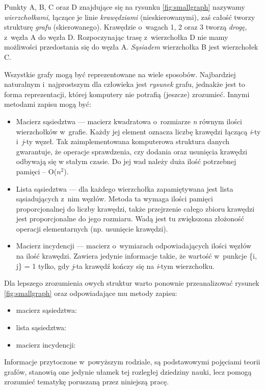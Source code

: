 \documentclass[a4paper,12pt,polish,oneside,openright]{thesis}
\begin{document}
Punkty A, B, C oraz D znajdujące się na rysunku \ref{fig:smallgraph} nazywamy \emph{wierzchołkami}, łączące je linie \emph{krawędziami} (nieskierowanymi), zaś całość tworzy strukturę \emph{grafu} (skierowanego).
Krawędzie o~wagach 1, 2 oraz 3 tworzą \emph{drogę}, z~węzła A do węzła D. Rozpoczynając trasę z~wierzchołka D nie mamy możliwości przedostania się do węzła A.
\emph{Sąsiadem} wierzchołka B jest wierzchołek C.

Wszystkie grafy mogą być reprezentowane na wiele sposobów.
Najbardziej naturalnym i~najprostszym dla człowieka jest \emph{rysunek} grafu, jednakże jest to forma reprezentacji, której komputery nie potrafią (jeszcze) zrozumieć.
Innymi metodami zapisu mogą być:
\begin{itemize}
	\item Macierz sąsiedztwa --- macierz kwadratowa o~rozmiarze \emph{n} równym ilości wierzchołków w~grafie.
	Każdy jej element oznacza liczbę krawędzi łączącą \emph{i}-ty i~\emph{j}-ty węzeł.
	Tak zaimplementowana komputerowa struktura danych gwarantuje, że operacje sprawdzenia, czy dodania oraz usunięcia krawędzi odbywają się w stałym czasie.
	Do jej wad należy duża ilość potrzebnej pamięci – O($n^2$).

	\label{neigh_list}
	\item Lista sąsiedztwa --- dla każdego wierzchołka zapamiętywana jest lista sąsiadujących z~nim węzłów.
	Metoda ta wymaga ilości pamięci proporcjonalnej do liczby krawędzi, także przejrzenie całego zbioru krawędzi jest proporcjonalne do jego rozmiaru.
	Wadą jest tu zwiększona złożoność operacji elementarnych (np. usunięcie krawędzi).

	\item Macierz incydencji --- macierz o~wymiarach odpowiadających ilości węzłów na ilość krawędzi.
	Zawiera jedynie informacje takie, że wartość w~punkcje \{i, j\} = 1 tylko, gdy \emph{j}-ta krawędź kończy się na \emph{i}-tym wierzchołku.
\end{itemize}

Dla lepszego zrozumienia owych struktur warto ponownie przeanalizować rysunek \ref{fig:smallgraph}
oraz odpowiadające mu metody zapisu:
\begin{itemize}
	\item macierz sąsiedztwa:
	\item lista sąsiedztwa:
	\item macierz incydencji:
\end{itemize}

Informacje przytoczone w~powyższym rodziale, są podstawowymi pojęciami teorii grafów, stanowią one jedynie ułamek tej rozległej dziedziny nauki, lecz pomogą zrozumieć tematykę poruszaną przez niniejszą pracę.
\end{document}
